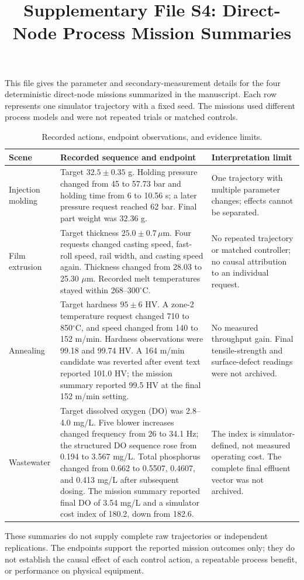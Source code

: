 \documentclass[10pt]{article}
\title{Supplementary File S4: Direct-Node Process Mission Summaries}
\author{}
\date{}
\begin{document}
\maketitle

This file gives the parameter and secondary-measurement details for the four
deterministic direct-node missions summarized in the manuscript. Each row
represents one simulator trajectory with a fixed seed. The missions used
different process models and were not repeated trials or matched controls.

\begin{table}[ht]
\centering
\caption{Recorded actions, endpoint observations, and evidence limits.}
\label{tab:s4-missions}
\footnotesize
\renewcommand{\arraystretch}{1.12}
\begin{tabularx}{\textwidth}{@{}>{\raggedright\arraybackslash}p{1.55cm}X X@{}}
\toprule
Scene & Recorded sequence and endpoint & Interpretation limit \\
\midrule
Injection molding & Target $32.5\pm0.35$ g. Holding pressure changed from
45 to 57.73 bar and holding time from 6 to 10.56 s; a later pressure request
reached 62 bar. Final part weight was 32.36 g. & One trajectory with multiple
parameter changes; effects cannot be separated. \\
Film extrusion & Target thickness $25.0\pm0.7\,\mu$m. Four requests changed
casting speed, fast-roll speed, rail width, and casting speed again. Thickness
changed from 28.03 to 25.30 $\mu$m. Recorded melt temperatures stayed within
268--300$^{\circ}$C. & No repeated trajectory or matched controller; no causal
attribution to an individual request. \\
Annealing & Target hardness $95\pm6$ HV. A zone-2 temperature request changed
710 to 850$^{\circ}$C, and speed changed from 140 to 152 m/min. Hardness
observations were 99.18 and 99.74 HV. A 164 m/min candidate was reverted after
event text reported 101.0 HV; the mission summary reported 99.5 HV at the final
152 m/min setting. & No measured throughput gain. Final tensile-strength and
surface-defect readings were not archived. \\
Wastewater & Target dissolved oxygen (DO) was 2.8--4.0 mg/L. Five blower
increases changed frequency from 26 to 34.1 Hz; the structured DO sequence
rose from 0.194 to 3.567 mg/L. Total phosphorus changed from 0.662 to 0.5507,
0.4607, and 0.413 mg/L after subsequent dosing. The mission summary reported
final DO of 3.54 mg/L and a simulator cost index of 180.2, down from 182.6. &
The index is simulator-defined, not measured operating cost. The complete
final effluent vector was not archived. \\
\bottomrule
\end{tabularx}
\end{table}

These summaries do not supply complete raw trajectories or independent
replications. The endpoints support the reported mission outcomes only; they
do not establish the causal effect of each control action, a repeatable
process benefit, or performance on physical equipment.
\end{document}
